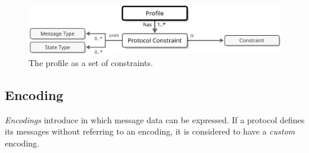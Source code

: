 \begin{figure}[ht!]
  \centering
  \includegraphics[scale=0.9]{figures/profile}
  \caption{
    The profile as a set of constraints.
  }
  \label{fig:profile}
\end{figure}

\subsection{Encoding}
\label{sec:concepts:encoding}

\textit{Encodings} introduce  in which message data can be expressed.
If a protocol defines its messages without referring to an encoding, it is considered to have a \textit{custom} encoding.
